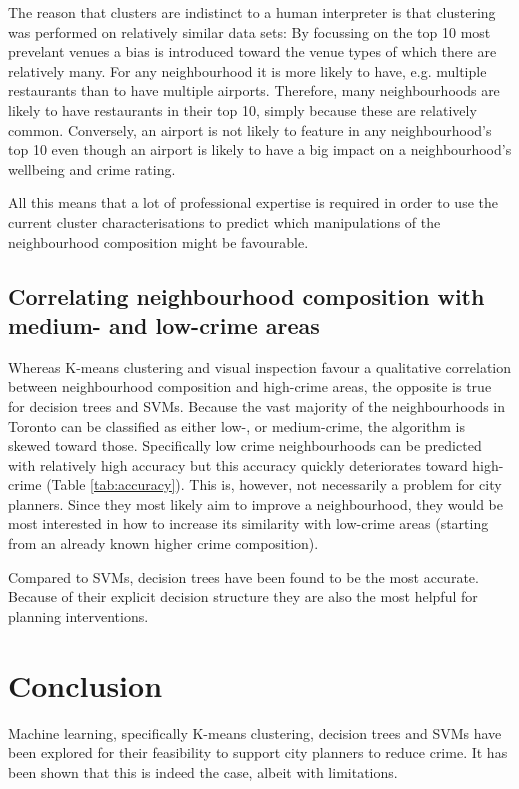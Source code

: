 \documentclass{article}
\begin{document}
The reason that clusters are indistinct to a human interpreter is that clustering was performed on relatively similar data sets: By focussing on the top 10 most prevelant venues a bias is introduced toward the venue types of which there are relatively many. For any neighbourhood it is more likely to have, e.g. multiple restaurants than to have multiple airports. Therefore, many neighbourhoods are likely to have restaurants in their top 10, simply because these are relatively common. Conversely, an airport is not likely to feature in any neighbourhood's top 10 even though an airport is likely to have a big impact on a neighbourhood's wellbeing and crime rating.

All this means that a lot of professional expertise is required in order to use the current cluster characterisations to predict which manipulations of the neighbourhood composition might be favourable.

\subsection{Correlating neighbourhood composition with medium- and low-crime areas}
Whereas K-means clustering and visual inspection favour a qualitative correlation between neighbourhood composition and high-crime areas, the opposite is true for decision trees and SVMs. Because the vast majority of the neighbourhoods in Toronto can be classified as either low-, or medium-crime, the algorithm is skewed toward those. Specifically low crime neighbourhoods can be predicted with relatively high accuracy but this accuracy quickly deteriorates toward high-crime (Table \ref{tab:accuracy}). This is, however, not necessarily a problem for city planners. Since they most likely aim to improve a neighbourhood, they would be most  interested in how to increase its similarity with low-crime areas (starting from an already known higher crime composition). 

Compared to SVMs, decision trees have been found to be the most accurate. Because of their explicit decision structure they are also the most helpful for planning interventions.

\section{Conclusion}
Machine learning, specifically K-means clustering, decision trees and SVMs have been explored for their feasibility to support city planners to reduce crime. It has been shown that this is indeed the case, albeit with limitations.
\end{document}
